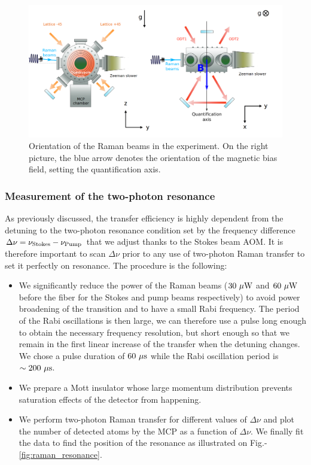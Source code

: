 \begin{figure}
    \centering
    \includegraphics[width=\textwidth]{Fig/Chapter3/raman_sc.png}
    \caption[Orientation of the Raman beams in the experiment]{Orientation of the Raman beams in the experiment. On the right picture, the blue arrow denotes the orientation of the magnetic bias field, setting the quantification axis.}
    \label{fig:raman_sc}
\end{figure}

\subsubsection{Measurement of the two-photon resonance}

As previously discussed, the transfer efficiency is highly dependent from the detuning to the two-photon resonance condition set by the frequency difference $\Delta \nu = \nu_{\rm{Stokes}} - \nu_{\rm{Pump}}$ that we adjust thanks to the Stokes beam AOM. It is therefore important to scan $\Delta \nu$ prior to any use of two-photon Raman transfer to set it perfectly on resonance. The procedure is the following:

\begin{itemize}
    \item We significantly reduce the power of the Raman beams ($30 \ \mu \rm{W}$ and $60 \ \mu \rm{W}$ before the fiber for the Stokes and pump beams respectively) to avoid power broadening of the transition and to have a small Rabi frequency. The period of the Rabi oscillations is then large, we can therefore use a pulse long enough to obtain the necessary frequency resolution, but short enough so that we remain in the first linear increase of the transfer when the detuning changes. We chose a pulse duration of $60 \ \mu \rm{s}$ while the Rabi oscillation period is $\sim 200 \ \mu \rm{s}$.
    \item We prepare a Mott insulator whose large momentum distribution prevents saturation effects of the detector from happening.
    \item We perform two-photon Raman transfer for different values of $\Delta \nu$ and plot the number of detected atoms by the MCP as a function of $\Delta \nu$. We finally fit the data to find the position of the resonance as illustrated on Fig.-\ref{fig:raman_resonance}.
\end{itemize}



